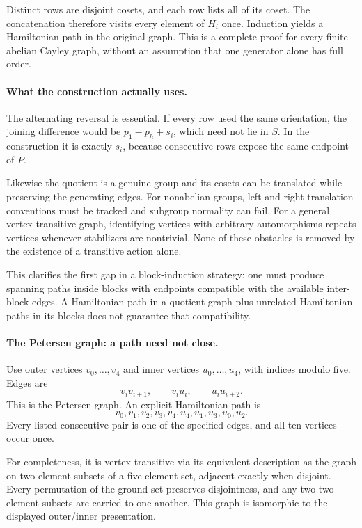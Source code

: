\documentclass[11pt]{article}
\begin{document}
Distinct rows are disjoint cosets, and each row lists all of its coset. The concatenation therefore visits every element of $H_i$ once. Induction yields a Hamiltonian path in the original graph. This is a complete proof for every finite abelian Cayley graph, without an assumption that one generator alone has full order.

\paragraph{What the construction actually uses.}
The alternating reversal is essential. If every row used the same orientation, the joining difference would be $p_1-p_h+s_i$, which need not lie in $S$. In the construction it is exactly $s_i$, because consecutive rows expose the same endpoint of $P$.

Likewise the quotient is a genuine group and its cosets can be translated while preserving the generating edges. For nonabelian groups, left and right translation conventions must be tracked and subgroup normality can fail. For a general vertex-transitive graph, identifying vertices with arbitrary automorphisms repeats vertices whenever stabilizers are nontrivial. None of these obstacles is removed by the existence of a transitive action alone.

This clarifies the first gap in a block-induction strategy: one must produce spanning paths inside blocks with endpoints compatible with the available inter-block edges. A Hamiltonian path in a quotient graph plus unrelated Hamiltonian paths in its blocks does not guarantee that compatibility.

\paragraph{The Petersen graph: a path need not close.}
Use outer vertices $v_0,\ldots,v_4$ and inner vertices $u_0,\ldots,u_4$, with indices modulo five. Edges are
\[
 v_iv_{i+1},\qquad v_iu_i,\qquad u_iu_{i+2}.
\]
This is the Petersen graph. An explicit Hamiltonian path is
\[
 v_0,v_1,v_2,v_3,v_4,u_4,u_1,u_3,u_0,u_2.
\]
Every listed consecutive pair is one of the specified edges, and all ten vertices occur once.

For completeness, it is vertex-transitive via its equivalent description as the graph on two-element subsets of a five-element set, adjacent exactly when disjoint. Every permutation of the ground set preserves disjointness, and any two two-element subsets are carried to one another. This graph is isomorphic to the displayed outer/inner presentation.
\end{document}
